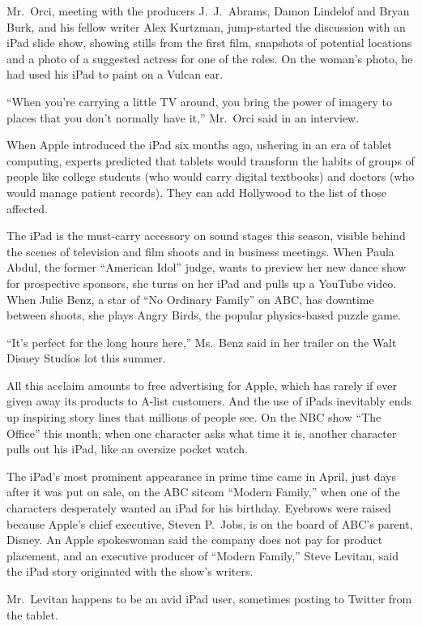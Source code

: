 ﻿\documentclass[12pt]{article}
\begin{document}
Mr.~Orci, meeting with the producers J.~J.~Abrams, Damon Lindelof and Bryan Burk, and his fellow
writer Alex Kurtzman, jump-started the discussion with an iPad slide show, showing stills from the
first film, snapshots of potential locations and a photo of a suggested actress for one of the
roles. On the woman's photo, he had used his iPad to paint on a Vulcan ear.

``When you're carrying a little TV around, you bring the power of imagery to places that you don't
normally have it,'' Mr.~Orci said in an interview.

When Apple introduced the iPad six months ago, ushering in an era of tablet computing, experts
predicted that tablets would transform the habits of groups of people like college students (who
would carry digital textbooks) and doctors (who would manage patient records). They can add
Hollywood to the list of those affected.

The iPad is the must-carry accessory on sound stages this season, visible behind the scenes of
television and film shoots and in business meetings. When Paula Abdul, the former ``American Idol''
judge, wants to preview her new dance show for prospective sponsors, she turns on her iPad and pulls
up a YouTube video. When Julie Benz, a star of ``No Ordinary Family'' on ABC, has downtime between
shoots, she plays Angry Birds, the popular physics-based puzzle game.

``It's perfect for the long hours here,'' Ms.~Benz said in her trailer on the Walt Disney Studios
lot this summer.

All this acclaim amounts to free advertising for Apple, which has rarely if ever given away its
products to A-list customers. And the use of iPads inevitably ends up inspiring story lines that
millions of people see. On the NBC show ``The Office'' this month, when one character asks what time
it is, another character pulls out his iPad, like an oversize pocket watch.

The iPad's most prominent appearance in prime time came in April, just days after it was put on
sale, on the ABC sitcom ``Modern Family,'' when one of the characters desperately wanted an iPad for
his birthday. Eyebrows were raised because Apple's chief executive, Steven P.~Jobs, is on the board
of ABC's parent, Disney. An Apple spokeswoman said the company does not pay for product placement,
and an executive producer of ``Modern Family,'' Steve Levitan, said the iPad story originated with
the show's writers.

Mr.~Levitan happens to be an avid iPad user, sometimes posting to Twitter from the tablet.
\end{document}
